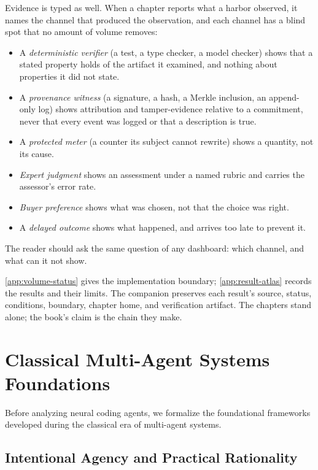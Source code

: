\documentclass[11pt,a4paper]{article}
\providecommand{\Cref}[1]{\ref{#1}}
\providecommand{\cref}[1]{\ref{#1}}
\begin{document}
Evidence is typed as well. When a chapter reports what a harbor observed, it
names the channel that produced the observation, and each channel has a blind
spot that no amount of volume removes:
\begin{itemize}[leftmargin=1.8em,itemsep=2pt]
  \item A \emph{deterministic verifier} (a test, a type checker, a model checker) shows that a stated property holds of the artifact it examined, and nothing about properties it did not state.
  \item A \emph{provenance witness} (a signature, a hash, a Merkle inclusion, an append-only log) shows attribution and tamper-evidence relative to a commitment, never that every event was logged or that a description is true.
  \item A \emph{protected meter} (a counter its subject cannot rewrite) shows a quantity, not its cause.
  \item \emph{Expert judgment} shows an assessment under a named rubric and carries the assessor's error rate.
  \item \emph{Buyer preference} shows what was chosen, not that the choice was right.
  \item A \emph{delayed outcome} shows what happened, and arrives too late to prevent it.
\end{itemize}
The reader should ask the same question of any dashboard: which channel, and what can it not show.

\Cref{app:volume-status} gives the implementation boundary;
\cref{app:result-atlas} records the results and their limits. The companion
 preserves each
result's source, status, conditions, boundary, chapter home, and verification
artifact. The chapters stand alone; the book's claim is the chain they make.

\section{Classical Multi-Agent Systems Foundations}\label{sec:prereq-classical-mas}

Before analyzing neural coding agents, we formalize the foundational frameworks developed during the classical era of multi-agent systems.

\subsection{Intentional Agency and Practical Rationality}
\end{document}
